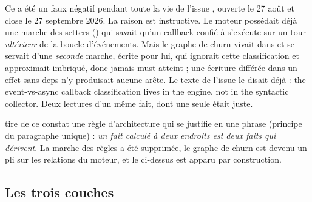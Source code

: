 Ce \Warning{} a été un faux négatif pendant toute la vie de l'issue , ouverte le 27 août et close le 27 septembre 2026. La raison est instructive. Le moteur possédait déjà une marche des setters () qui savait qu'un callback confié à  s'exécute sur un tour \emph{ultérieur} de la boucle d'événements. Mais le graphe de churn vivait dans  et se servait d'une \emph{seconde} marche, écrite pour lui, qui ignorait cette classification et approximait \og imbriqué, donc jamais must-atteint\fg{} ; une écriture différée dans un effet sans deps n'y produisait aucune arête. Le texte de l'issue le disait déjà : \og the event-vs-async callback classification lives in the engine, not in the syntactic collector\fg{}. Deux lectures d'un même fait, dont une seule était juste.

 tire de ce constat une règle d'architecture qui se justifie en une phrase (principe du paragraphe unique) : \emph{un fait calculé à deux endroits est deux faits qui dérivent}. La marche des règles a été supprimée, le graphe de churn est devenu un pli sur les relations du moteur, et le \Warning{} ci-dessus est apparu \og par construction\fg{}.

\subsection{Les trois couches}

